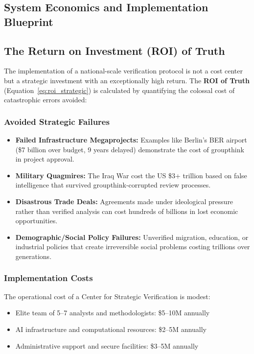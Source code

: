 \documentclass[11pt,a4paper]{article}
\begin{document}
\begin{small}
\section{System Economics and Implementation Blueprint}
\subsection{The Return on Investment (ROI) of Truth}
The implementation of a national-scale verification protocol is not a cost center but a strategic investment with an exceptionally high return. The \textbf{ROI of Truth} (Equation~\eqref{eq:roi_strategic}) is calculated by quantifying the colossal cost of catastrophic errors avoided:

\subsubsection{Avoided Strategic Failures}
\begin{itemize}[nosep]
    \item \textbf{Failed Infrastructure Megaprojects:} Examples like Berlin's BER airport (\$7 billion over budget, 9 years delayed) demonstrate the cost of groupthink in project approval.
    
    \item \textbf{Military Quagmires:} The Iraq War cost the US \$3+ trillion based on false intelligence that survived groupthink-corrupted review processes.
    
    \item \textbf{Disastrous Trade Deals:} Agreements made under ideological pressure rather than verified analysis can cost hundreds of billions in lost economic opportunities.
    
    \item \textbf{Demographic/Social Policy Failures:} Unverified migration, education, or industrial policies that create irreversible social problems costing trillions over generations.
\end{itemize}

\subsubsection{Implementation Costs}
The operational cost of a Center for Strategic Verification is modest:
\begin{itemize}[nosep]
    \item Elite team of 5--7 analysts and methodologists: \$5--10M annually
    \item AI infrastructure and computational resources: \$2--5M annually
    \item Administrative support and secure facilities: \$3--5M annually
\end{itemize}


\end{small}
\end{document}
